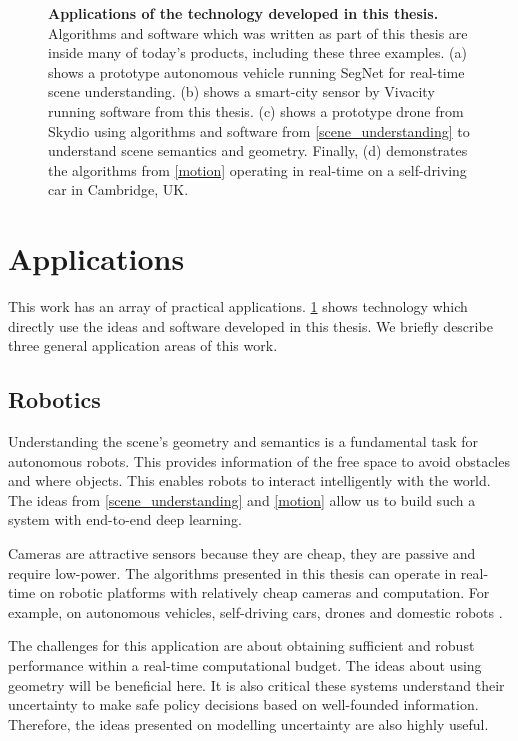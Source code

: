\begin{figure}[pt]
\begin{subfigure}[t]{0.98\textwidth}
    \end{subfigure}%
\caption[Applications of technology in this thesis]{\textbf{Applications of the technology developed in this thesis.} Algorithms and software which was written as part of this thesis are inside many of today's products, including these three examples. (a) shows a prototype autonomous vehicle running SegNet for real-time scene understanding. (b) shows a smart-city sensor by Vivacity \citep{vivacity} running software from this thesis. (c) shows a prototype drone from Skydio \citep{skydio} using algorithms and software from \cref{scene_understanding} to understand scene semantics and geometry. Finally, (d) demonstrates the algorithms from \cref{motion} operating in real-time on a self-driving car in Cambridge, UK.}
\label{ch6:applications}
\end{figure} 

\section{Applications}

This work has an array of practical applications. \cref{ch6:applications} shows technology which directly use the ideas and software developed in this thesis. We briefly describe three general application areas of this work.


\subsection{Robotics}
Understanding the scene’s geometry and semantics is a fundamental task for autonomous robots. This provides information of the free space to avoid obstacles and where objects. This enables robots to interact intelligently with the world. The ideas from \cref{scene_understanding} and \cref{motion} allow us to build such a system with end-to-end deep learning.

Cameras are attractive sensors because they are cheap, they are passive and require low-power. The algorithms presented in this thesis can operate in real-time on robotic platforms with relatively cheap cameras and computation. For example, on autonomous vehicles, self-driving cars, drones and domestic robots \citep{kendall2014board,mcallister2017av_bdl,kendall2018learning}.

The challenges for this application are about obtaining sufficient and robust performance within a real-time computational budget. The ideas about using geometry will be beneficial here. It is also critical these systems understand their uncertainty to make safe policy decisions based on well-founded information. Therefore, the ideas presented on modelling uncertainty are also highly useful.

